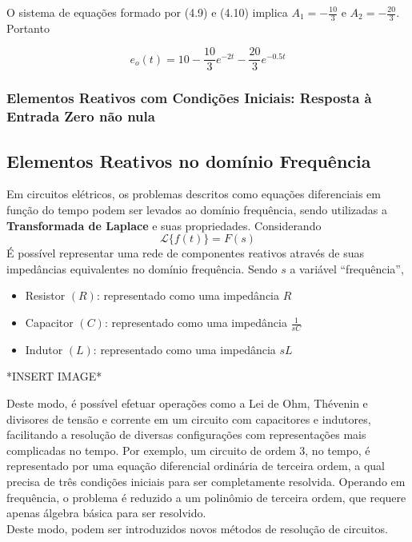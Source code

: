 \documentclass{article}
\numberwithin{equation}{section}
\begin{document}
    O sistema de equações formado por (4.9) e (4.10) implica $A_{1}  = \displaystyle{-\frac{10}{3}} $ e $A_{2} = \displaystyle{-\frac{20}{3}}$. Portanto

    \begin{equation*}
        e_{o}(t) = 10 - \frac{10}{3}e^{-2t} - \frac{20}{3}e^{-0.5t}
    \end{equation*}


    \subsubsection{Elementos Reativos com Condições Iniciais: Resposta à Entrada Zero não nula}
    \label{subsubsec:entradazeronaonula}

    \subsection{Elementos Reativos no domínio Frequência}
    \label{subesc:frequencia}
    Em circuitos elétricos, os problemas descritos como equações diferenciais em função do tempo podem ser levados ao domínio frequência, sendo utilizadas a \textbf{Transformada de Laplace} e suas propriedades. Considerando
    $$\mathscr{L}\{f(t)\}=F(s)$$
    É possível representar uma rede de componentes reativos através de suas impedâncias equivalentes no domínio frequência. Sendo $s$ a variável ``frequência'',
    \begin{itemize}
        \item Resistor $(R)$: representado como uma impedância $R$
        \item Capacitor $(C)$: representado como uma impedância $\displaystyle{\frac{1}{sC}}$
        \item Indutor $(L)$: representado como uma impedância $sL$
    \end{itemize}
    *INSERT IMAGE*

    Deste modo, é possível efetuar operações como a Lei de Ohm, Thévenin e divisores de tensão e corrente em um circuito com capacitores e indutores, facilitando a resolução de diversas configurações com representações mais complicadas no tempo. Por exemplo, um circuito de ordem 3, no tempo, é representado por uma equação diferencial ordinária de terceira ordem, a qual precisa de três condições iniciais para ser completamente resolvida. Operando em frequência, o problema é reduzido a um polinômio de terceira ordem, que requere apenas álgebra básica para ser resolvido. \\
    Deste modo, podem ser introduzidos novos métodos de resolução de circuitos.
\end{document}
